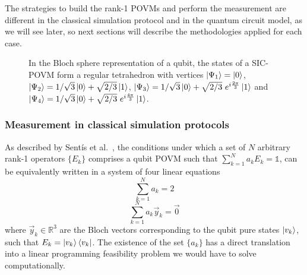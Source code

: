 The strategies to build the rank-1 POVMs and perform the measurement are different in the classical simulation protocol and in the quantum circuit model, as we will see later, so next sections will describe the methodologies applied for each case.

\begin{figure}[!ht]
\begin{center}
\centerline{}
\caption[SIC-POVM as tetrahedron in Bloch sphere]%
{\label{fig:sic_povm}%
In the Bloch sphere representation of a qubit, the states of a SIC-POVM form a regular tetrahedron with vertices $\ket{\Psi_1}=\ket{0}$, $\ket{\Psi_2}=1/{\sqrt{3}}\ket{0} + \sqrt{2/3} \ket{1}$, $\ket{\Psi_3}=1/{\sqrt{3}}\ket{0} + \sqrt{2/3} \ e^{i\frac{2\pi}{3}} \ket{1}$ and $\ket{\Psi_4}=1/{\sqrt{3}}\ket{0} + \sqrt{2/3}\ e^{i\frac{4\pi}{3}} \ket{1}$.}
\end{center}
\end{figure}

\subsubsection{Measurement in classical simulation protocols}\label{section:povm_generation}
As described by Sent\'is et al.\ \cite{sentis2013}, the conditions under which a set of $N$ arbitrary rank-1 operators $\{E_{k}\}$ comprises a qubit POVM such that $\sum_{k=1}^{N} a_{k} E_{k} = \mathbb{1}$, can be equivalently written in a system of four linear equations
\begin{equation}
    \sum_{k=1}^{N} a_{k} = 2
\end{equation}
\begin{equation}
    \sum_{k=1}^{N} a_{k} \vec{y}_{k} = \vec{0}
\end{equation}
where $\vec{y}_{k} \in \mathbb{R}^3$ are the Bloch vectors corresponding to the qubit pure states $\ket{v_{k}}$, such that $E_k = \ket{v_k}\bra{v_k}$. The existence of the set $\{a_{k}\}$ has a direct translation into a linear programming feasibility problem we would have to solve computationally.

